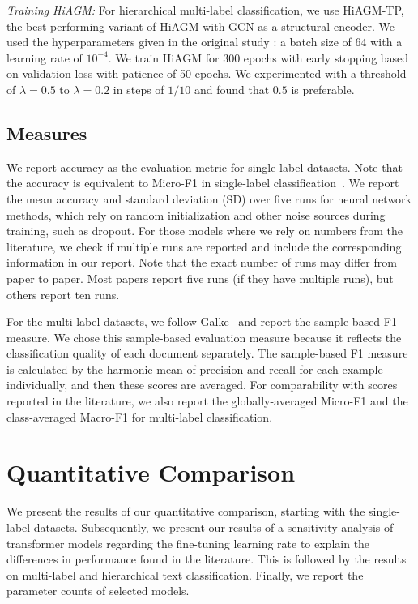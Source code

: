 \documentclass[acmsmall,nonacm]{acmart}
\begin{document}
\textit{Training HiAGM:}
For hierarchical multi-label classification, we use HiAGM-TP, the best-performing variant of HiAGM with GCN as a structural encoder. 
We used the hyperparameters given in the original study \cite{hiagm}: a batch size of $64$ with a learning rate of $10^{-4}$. 
We train HiAGM for 300 epochs with early stopping based on validation loss with patience of 50 epochs.
We experimented with a threshold of $\lambda=0.5$ to $\lambda=0.2$ in steps of $1/10$ and found that $0.5$ is preferable.

\subsection{Measures}
We report accuracy as the evaluation metric for single-label datasets.
Note that the accuracy is equivalent to Micro-F1 in single-label classification~\cite{galkescherp-acl2022}.
We report the mean accuracy and standard deviation (SD) over five runs for neural network methods, which rely on random initialization and other noise sources during training, such as dropout. 
For those models where we rely on numbers from the literature, we check if multiple runs are reported and include the corresponding information in our report. 
Note that the exact number of runs may differ from paper to paper. Most papers report five runs (if they have multiple runs), but others report ten runs.

For the multi-label datasets, we follow Galke~\etal\cite{DBLP:conf/kcap/GalkeMSBS17} and report the sample-based F1 measure. 
We chose this sample-based evaluation measure because it reflects the classification quality of each document separately. 
The sample-based F1 measure is calculated by the harmonic mean of precision and recall for each example individually, and then these scores are averaged.
For comparability with scores reported in the literature, we also report the globally-averaged Micro-F1 and the class-averaged Macro-F1 for multi-label classification.

\section{Quantitative Comparison}\label{sec:results}

We present the results of our quantitative comparison, starting with the single-label datasets.
Subsequently, we present our results of a sensitivity analysis of transformer models regarding the fine-tuning learning rate to explain the differences in performance found in the literature.
This is followed by the results on multi-label and hierarchical text classification. Finally, we report the parameter counts of selected models.
\end{document}
